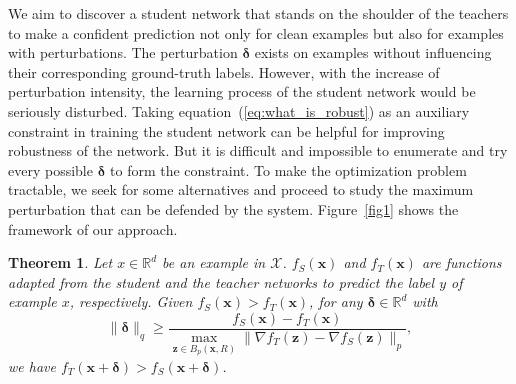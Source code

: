 \documentclass[journal]{IEEEtran}
\newtheorem{thm}{Theorem}
\newcommand{\Eref}[1]{equation~(\ref{#1})}
\newcommand{\Fref}[1]{Figure~\ref{#1}}
\newcommand{\bx}{\bm{x}}
\newcommand{\bz}{\bm{z}}
\newcommand{\bdelta}{\bm{\delta}}
\begin{document}
We aim to discover a student network that stands on the shoulder of the teachers to make a confident prediction not only for clean examples but also for examples with perturbations. The perturbation $\bdelta$ exists on examples without influencing their corresponding ground-truth labels. However, with the increase of perturbation intensity, the learning process of the student network would be seriously disturbed. Taking \Eref{eq:what_is_robust} as an auxiliary constraint in training the student network can be helpful for improving robustness of the network. But it is difficult and impossible to enumerate and try every possible $\bdelta$ to form the constraint. To make the optimization problem tractable, we seek for some alternatives and proceed to study the maximum perturbation that can be defended by the system. \Fref{fig1} shows the framework of our approach.

\begin{thm}
Let $x\in \mathbb R^d$ be an example in $\mathcal X$. $f_S(\bx)$ and $f_T(\bx)$ are functions adapted from the student and the teacher networks to predict the label $y$ of example $x$, respectively. Given $f_S(\bx) > f_T(\bx)$, for any $\bdelta\in \mathbb R^d$ with
\begin{equation}
\|\bdelta\|_q\geq 
\frac{f_S(\bx) - f_T(\bx)}{\max_{\bz\in B_p(\bx,R)}\|\nabla f_T(\bz)-\nabla f_S(\bz)\|_p},
\label{eq:theorem1}
\end{equation}
we have $f_T(\bx+\bdelta)>f_S(\bx+\bdelta)$.
\end{thm}
\end{document}
